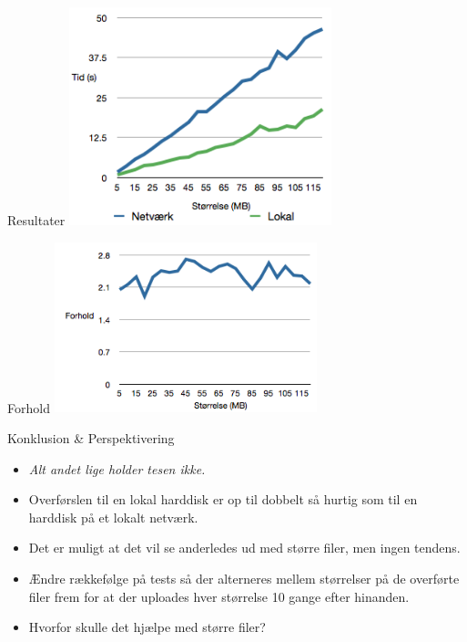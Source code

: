 \documentclass{beamer}
\begin{document}
\begin{frame}{Resultater}
\includegraphics[width=3in]{ploto.png}
\end{frame}

\begin{frame}{Forhold}
\includegraphics[width=3in]{plotforhold.png}
\end{frame}

\begin{frame}{Konklusion \& Perspektivering}
\begin{itemize}
\item \textit{ Alt andet lige holder tesen ikke.}
\item Overførslen til en lokal harddisk er op til dobbelt så hurtig som til en harddisk på et lokalt netværk.
\item Det er muligt at det vil se anderledes ud med større filer, men ingen tendens.
\item Ændre rækkefølge på tests så der alterneres mellem størrelser på de overførte filer frem for at der uploades hver størrelse 10 gange efter hinanden.
\item Hvorfor skulle det hjælpe med større filer?
\end{itemize}
\end{frame}
\end{document}
